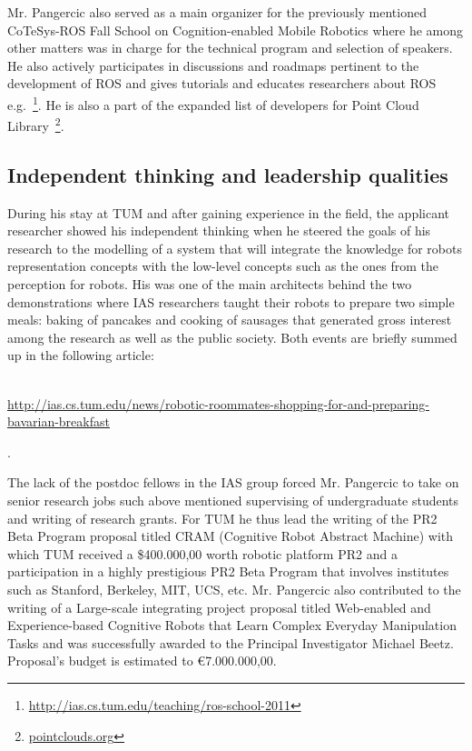 Mr. Pangercic also served as a main organizer for the previously mentioned CoTeSys-ROS Fall School on 
Cognition-enabled Mobile Robotics where he among other matters was in charge for the technical
program and selection of speakers. He also actively participates in discussions and roadmaps
pertinent to the development of ROS and gives tutorials and educates researchers about
ROS e.g.~\footnote{\url{http://ias.cs.tum.edu/teaching/ros-school-2011}}. He is also a part of
the expanded list of developers for Point Cloud Library~\footnote{\url{pointclouds.org}}.
 
\subsection{Independent thinking and leadership qualities} 
During his stay at TUM and after gaining experience in the field, the applicant researcher 
showed his independent thinking when he steered the goals of his research to the
modelling of a system that will integrate the knowledge for robots representation concepts
with the low-level concepts such as the ones from the perception for robots.
His was one of the main architects behind the two demonstrations where IAS researchers
taught their robots to prepare two simple meals: baking of pancakes and cooking of 
sausages that generated gross interest among the research as well as the public
society. Both events are briefly summed up in the following 
article:\\~\begin{small}\url{http://ias.cs.tum.edu/news/robotic-roommates-shopping-for-and-preparing-bavarian-breakfast}\end{small}.

The lack of the postdoc fellows in the IAS group forced Mr. Pangercic to take on senior research
jobs such above mentioned supervising of undergraduate students and writing of research grants.
For TUM he thus lead the writing of the PR2 Beta Program proposal titled CRAM (Cognitive Robot Abstract Machine)
with which TUM received a \$400.000,00 worth robotic platform PR2 and a participation in a highly 
prestigious PR2 Beta Program that involves institutes such as Stanford, Berkeley, MIT, UCS, etc.
Mr. Pangercic also contributed to the writing of a Large-scale integrating project proposal titled Web-enabled and Experience-based 
Cognitive Robots that Learn Complex Everyday Manipulation Tasks and was successfully awarded to 
the Principal Investigator Michael Beetz. Proposal's budget is estimated to \euro7.000.000,00.

